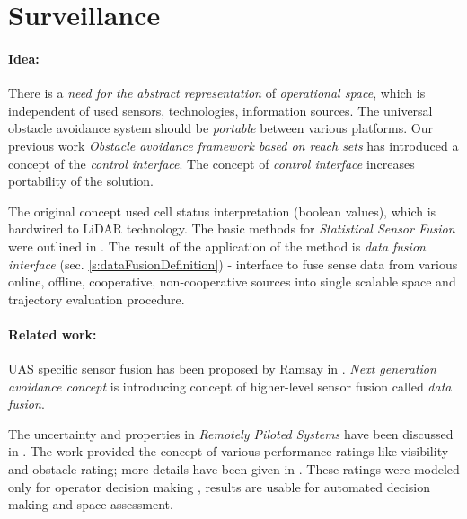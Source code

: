 \section{Surveillance}\label{s:dataFusionProbabilisticModelTheory}
\paragraph{Idea:}  There is a \emph{need for the abstract representation} of \emph{operational space}, which is independent of used sensors, technologies, information sources. The universal obstacle avoidance system should be \emph{portable} between various platforms. Our previous work \emph{Obstacle avoidance framework based on reach sets} \cite{gomola2017obstacle} has introduced a concept of the \emph{control interface}. The concept of \emph{control interface} increases portability of the solution.

The original concept used cell status interpretation (boolean values), which is hardwired to LiDAR technology. The basic methods for \emph{Statistical Sensor Fusion} were outlined in \cite{gustafsson2010statistical}. The result of the application of the method is \emph{data fusion interface} (sec. \ref{s:dataFusionDefinition}) - interface to fuse sense data from various online, offline, cooperative, non-cooperative sources into single scalable {space and trajectory evaluation procedure}.
    
\paragraph{Related work:} UAS specific sensor fusion has been proposed by Ramsay in \cite{ramasamy2014avionics}. \emph{Next generation avoidance concept} \cite{ramasamy2014next} is introducing concept of higher-level sensor fusion called \emph{data fusion}. 

The uncertainty and properties in \emph{Remotely Piloted Systems} have been discussed in \cite{chynchenko2016remotely}. The work provided the concept of various performance ratings like visibility and obstacle rating; more details have been given in \cite{shmelova2016modeling}. These ratings were modeled only for operator decision making \cite{kharchenko2017modelling}, results are usable for automated decision making and space assessment. 




